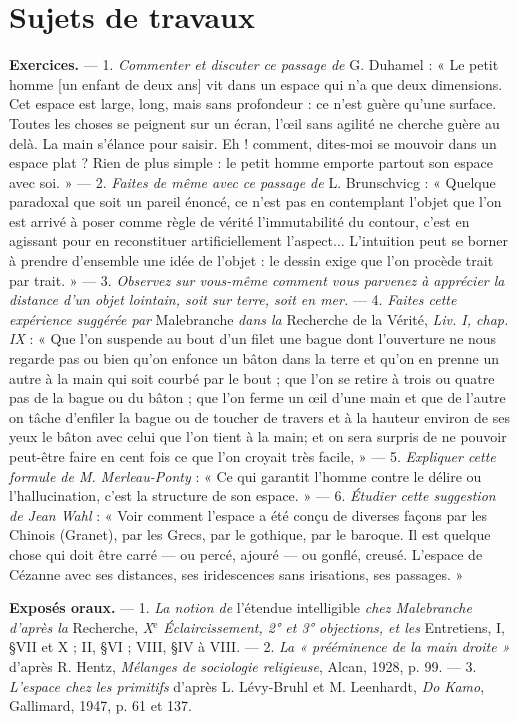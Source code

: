 \section{Sujets de travaux}%

{\bf Exercices.} — 1. {\it Commenter et discuter ce passage de} G. Duhamel : « Le
petit homme [un enfant de deux ans] vit dans un espace qui n’a que deux
dimensions. Cet espace est large, long, mais sans profondeur : ce n’est
guère qu’une surface. Toutes les choses se peignent sur un écran, l'œil
sans agilité ne cherche guère au delà. La main s’élance pour saisir. Eh !
comment, dites-moi se mouvoir dans un espace plat ? Rien de plus simple :
le petit homme emporte partout son espace avec soi. » — 2. {\it Faites de même
avec ce passage de} L. Brunschvicg : « Quelque paradoxal que soit un pareil
énoncé, ce n’est pas en contemplant l’objet que l’on est arrivé à poser
comme règle de vérité l’immutabilité du contour, c’est en agissant pour en
reconstituer artificiellement l’aspect... L’intuition peut se borner à prendre
d'ensemble une idée de l’objet : le dessin exige que l’on procède trait par
trait. » — 3. {\it Observez sur vous-même comment vous parvenez à apprécier
la distance d'un objet lointain, soit sur terre, soit en mer.} — 4. {\it Faites cette
expérience suggérée par} Malebranche {\it dans la} Recherche de la Vérité,
{\it Liv. I, chap. IX} : « Que l’on suspende au bout d’un filet une bague dont
l'ouverture ne nous regarde pas ou bien qu’on enfonce un bâton dans la
terre et qu’on en prenne un autre à la main qui soit courbé par le bout ;
que l’on se retire à trois ou quatre pas de la bague ou du bâton ; que l’on
ferme un œil d’une main et que de l’autre on tâche d’enfiler la bague ou de
toucher de travers et à la hauteur environ de ses yeux le bâton avec celui
que l’on tient à la main; et on sera surpris de ne pouvoir peut-être faire
en cent fois ce que l’on croyait très facile, » — 5. {\it Expliquer cette formule de
M. Merleau-Ponty} : « Ce qui garantit l’homme contre le délire ou l’hallucination,
c’est la structure de son espace. » — 6. {\it Étudier cette suggestion de
Jean Wahl} : « Voir comment l’espace a été conçu de diverses façons par les
Chinois (Granet), par les Grecs, par le gothique, par le baroque. Il est
quelque chose qui doit être carré — ou percé, ajouré — ou gonflé, creusé.
L'espace de Cézanne avec ses distances, ses iridescences sans irisations,
ses passages. »

{\bf Exposés oraux.} — 1. {\it La notion de} l'étendue intelligible {\it chez Malebranche
d'après la} Recherche, {\it X$^\text{e}$ Éclaircissement, 2° et 3° objections, et les} Entretiens,
I, \S VII et X ; II, \S VI ; VIII, \S IV à VIII. — 2. {\it La « prééminence de
la main droite »} d’après R. Hentz, {\it Mélanges de sociologie religieuse}, Alcan,
1928, p. 99. — 3. {\it L'espace chez les primitifs} d'après L. Lévy-Bruhl et
M. Leenhardt, {\it Do Kamo}, Gallimard, 1947, p. 61 et 137.

